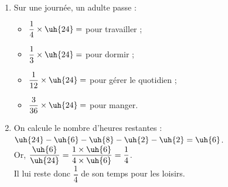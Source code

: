 \begin{colonne*exercice}
\begin{corrige}
   \ \\ [-5mm]
   \begin{enumerate}
      \item Sur une journée, un adulte passe : \smallskip
      \begin{itemize}
         \item $\dfrac14\times\uh{24} =$ {\blue {} pour travailler} ; \\ [2mm]
         \item $\dfrac13\times\uh{24} =$ {\blue {} pour dormir} ; \\ [2mm]
         \item $\dfrac1{12}\times\uh{24} =$ {\blue {} pour gérer le quotidien} ; \\ [2mm]
         \item $\dfrac{3}{36}\times\uh{24} =$ {\blue {} pour manger.} \\ [3mm]
      \end{itemize}
      \item On calcule le nombre d'heures restantes : \\
          $\uh{24}-\uh{6}-\uh{8}-\uh{2}-\uh{2} =\uh{6}$. \\ [2mm]
         Or, $\dfrac{\uh{6}}{\uh{24}} =\dfrac{1\times\uh{6}}{4\times\uh{6}} =\dfrac14$. \\ [2mm]
         {\blue Il lui reste donc $\dfrac14$ de son temps pour les loisirs.} \bigskip
   \end{enumerate} 
   \ \\ [3cm]
\end{corrige}

\bigskip



\end{colonne*exercice}
